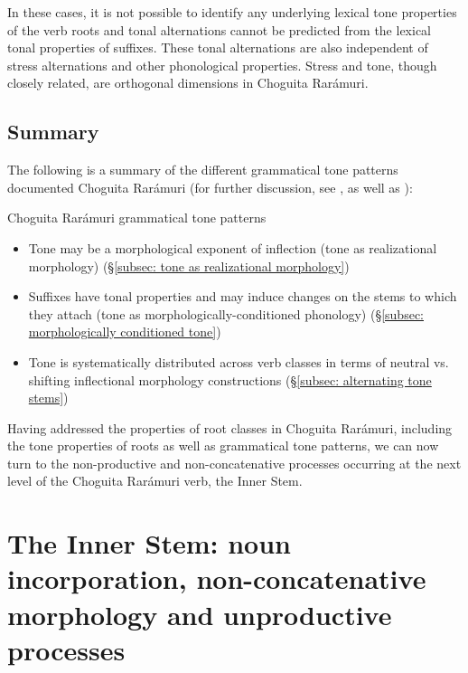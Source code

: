 In these cases, it is not possible to identify any underlying lexical tone properties of the verb roots and tonal alternations cannot be predicted from the lexical tonal properties of suffixes. These tonal alternations are also independent of stress alternations and other phonological properties. Stress and tone, though closely related, are orthogonal dimensions in Choguita Rarámuri.

\subsection{Summary}
\label{subsec:9:summary:tone}

The following is a summary of the different grammatical tone patterns documented Choguita Rarámuri (for further discussion, see , as well as \citealt{caballero2021grammatical}):

\ea\label{ex: morphological dimensions of CR tone}
{Choguita Rarámuri grammatical tone patterns}

\begin{itemize}
\item
Tone may be a morphological exponent of inflection (tone as realizational morphology) (§\ref{subsec: tone as realizational morphology}) \\
\item
Suffixes have tonal properties and may induce changes on the stems to which they attach (tone as morphologically-conditioned phonology) (§\ref{subsec: morphologically conditioned tone})\\
\item
Tone is systematically distributed across verb classes in terms of neutral vs. shifting inflectional morphology constructions (§\ref{subsec: alternating tone stems}) \\
\end{itemize}

\z

Having addressed the properties of root classes in Choguita Rarámuri, including the tone properties of roots as well as grammatical tone patterns, we can now turn to the non-productive and non-concatenative processes occurring at the next level of the Choguita Rarámuri verb, the Inner Stem.


\section[The Inner Stem]{The Inner Stem: noun incorporation, non-concatenative morphology and unproductive processes}
\label{sec: the inner stem}


